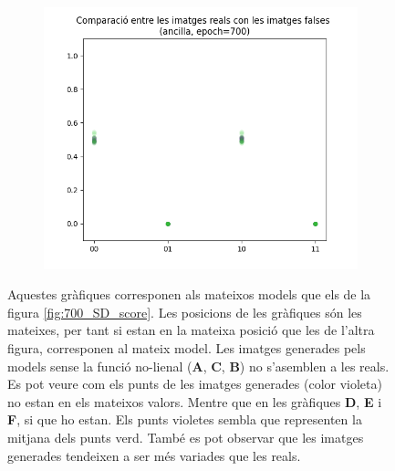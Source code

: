 \begin{figure}
\begin{subfigure}[b]{.32\linewidth}
		\includegraphics[width=\linewidth]{figures/data/scatter_plot_A6.png}
		\caption{}
	\end{subfigure}
	\label{fig:700_images}
	\caption{Aquestes gràfiques corresponen als mateixos models que els de la figura \ref{fig:700_SD_score}. Les posicions de les gràfiques són les mateixes, per tant si estan en la mateixa posició que les de l'altra figura, corresponen al mateix model. Les imatges generades pels models sense la funció no-lienal  (\textbf{A}, \textbf{C}, \textbf{B}) no s'asemblen a les reals. Es pot veure com els punts de les imatges generades (color violeta) no estan en els mateixos valors. Mentre que en les gràfiques \textbf{D}, \textbf{E} i \textbf{F}, si que ho estan. Els punts violetes sembla que representen la mitjana dels punts verd. També es pot observar que les imatges generades tendeixen a ser més variades que les reals.}
	
\end{figure}



